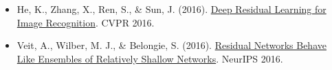 \vspace{0.25em}
\begin{itemize}
\tightlist
\item
  He, K., Zhang, X., Ren, S., \& Sun, J. (2016). \href{https://arxiv.org/abs/1512.03385}{Deep Residual Learning for Image Recognition}. CVPR 2016.
\item
  Veit, A., Wilber, M. J., \& Belongie, S. (2016). \href{https://proceedings.neurips.cc/paper_files/paper/2016/hash/37bc2f75bf1bcfe8450a1a41c200364c-Abstract.html}{Residual Networks Behave Like Ensembles of Relatively Shallow Networks}. NeurIPS 2016.
\end{itemize}

\clearpage
